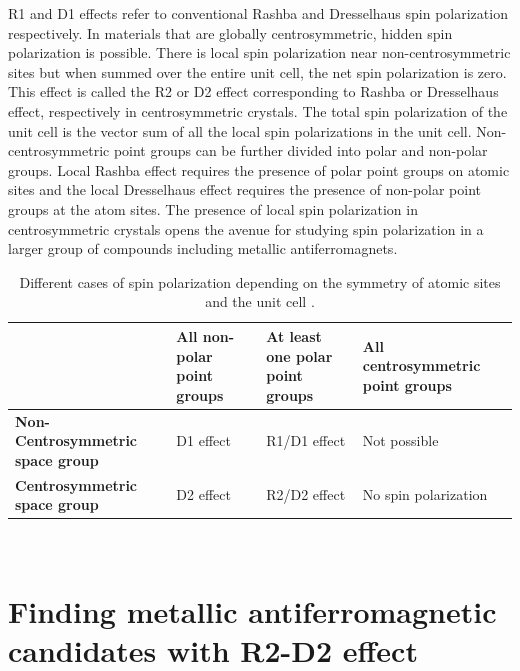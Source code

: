 \documentclass[10pt,doublespacing,edeposit]{uiucthesis2020}
\begin{document}
\begin{mainmatter}
R1 and D1 effects refer to conventional Rashba and Dresselhaus spin polarization respectively. In materials that are globally centrosymmetric, hidden spin polarization is possible. There is local spin polarization near non-centrosymmetric sites but when summed over the entire unit cell, the net spin polarization is zero. This effect is called the R2 or D2 effect corresponding to Rashba or Dresselhaus effect, respectively in centrosymmetric crystals. The total spin polarization of the unit cell is the vector sum of all the local spin polarizations in the unit cell. Non-centrosymmetric point groups can be further divided into polar and non-polar groups. Local Rashba effect requires the presence of polar point groups on atomic sites and the local Dresselhaus effect requires the presence of non-polar point groups at the atom sites. The presence of local spin polarization in centrosymmetric crystals opens the avenue for studying spin polarization in a larger group of compounds including metallic antiferromagnets.

\renewcommand{\arraystretch}{1.2}
\begin{table}
\caption{\label{tab:RD_effect} 
Different cases of spin polarization depending on the symmetry of atomic sites and the unit cell \cite{Zhang2014}.}
\centering
\begin{tabular}{>{\raggedright\arraybackslash}p{5cm}>{\raggedright\arraybackslash}p{3cm}>{\raggedright\arraybackslash}p{3cm}>{\raggedright\arraybackslash}p{3cm}}
\hline\hline
\textbf{} & \textbf{All non-polar point groups} & \textbf{At least one polar point groups} & \textbf{All centrosymmetric point groups}\\
\hline
\textbf{Non-Centrosymmetric space group} & D1 effect & R1/D1 effect & Not possible\\
\hline
\textbf{Centrosymmetric space group} & D2 effect & R2/D2 effect & No spin polarization\\
\hline\hline
\end{tabular}
~\\
\end{table}

\section{Finding metallic antiferromagnetic candidates with R2-D2 effect}


\end{mainmatter}
\end{document}
